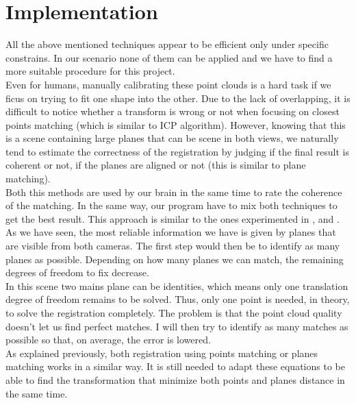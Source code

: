 
\chapter{Implementation}

All the above mentioned techniques appear to be efficient only under specific constrains. In our scenario none of them can be applied and we have to find a more suitable procedure for this project. \\
Even for humans, manually calibrating these point clouds is a hard task if we ficus on trying to fit one shape into the other. Due to the lack of overlapping, it is difficult to notice whether a transform is wrong or not when focusing on closest points matching (which is similar to ICP algorithm). However, knowing that this is a scene containing large planes that can be scene in both views, we naturally tend to estimate the correctness of the registration by judging if the final result is coherent or not, if the planes are aligned or not (this is similar to plane matching). \\
Both this methods are used by our brain in the same time to rate the coherence of the matching. In the same way, our program have to mix both techniques to get the best result. This approach is similar to the ones experimented in \cite{aravindh}, \cite{ytaguchi2013} and \cite{mdou2013}.\\
\newline
As we have seen, the most reliable information we have is given by planes that are visible from both cameras. The first step would then be to identify as many planes as possible. Depending on how many planes we can match, the remaining degrees of freedom to fix decrease. \\
In this scene two mains plane can be identities, which means only one translation degree of freedom remains to be solved. Thus, only one point is needed, in theory, to solve the registration completely. The problem is that the point cloud quality doesn't let us find perfect matches. I will then try to identify as many matches as possible so that, on average, the error is lowered. \\
\newline
As explained previously, both registration using points matching or planes matching works in a similar way. It is still needed to adapt these equations to be able to find the transformation that minimize both points and planes distance in the same time. 

